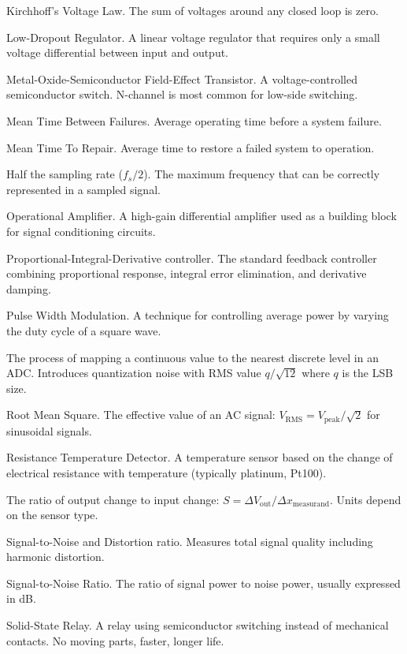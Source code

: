 \documentclass[11pt,letterpaper,twoside,openany]{book}
\begin{document}
\begin{description}[style=nextline,leftmargin=3em,font=\sffamily\bfseries]
\item[KVL] Kirchhoff's Voltage Law. The sum of voltages around any closed loop is zero.
\item[LDO] Low-Dropout Regulator. A linear voltage regulator that requires only a small voltage differential between input and output.
\item[MOSFET] Metal-Oxide-Semiconductor Field-Effect Transistor. A voltage-controlled semiconductor switch. N-channel is most common for low-side switching.
\item[MTBF] Mean Time Between Failures. Average operating time before a system failure.
\item[MTTR] Mean Time To Repair. Average time to restore a failed system to operation.
\item[Nyquist Frequency] Half the sampling rate ($f_s/2$). The maximum frequency that can be correctly represented in a sampled signal.
\item[Op-Amp] Operational Amplifier. A high-gain differential amplifier used as a building block for signal conditioning circuits.
\item[PID] Proportional-Integral-Derivative controller. The standard feedback controller combining proportional response, integral error elimination, and derivative damping.
\item[PWM] Pulse Width Modulation. A technique for controlling average power by varying the duty cycle of a square wave.
\item[Quantization] The process of mapping a continuous value to the nearest discrete level in an ADC. Introduces quantization noise with RMS value $q/\sqrt{12}$ where $q$ is the LSB size.
\item[RMS] Root Mean Square. The effective value of an AC signal: $V_{\text{RMS}} = V_{\text{peak}}/\sqrt{2}$ for sinusoidal signals.
\item[RTD] Resistance Temperature Detector. A temperature sensor based on the change of electrical resistance with temperature (typically platinum, Pt100).
\item[Sensitivity] The ratio of output change to input change: $S = \Delta V_{\text{out}} / \Delta x_{\text{measurand}}$. Units depend on the sensor type.
\item[SINAD] Signal-to-Noise and Distortion ratio. Measures total signal quality including harmonic distortion.
\item[SNR] Signal-to-Noise Ratio. The ratio of signal power to noise power, usually expressed in dB.
\item[SSR] Solid-State Relay. A relay using semiconductor switching instead of mechanical contacts. No moving parts, faster, longer life.

\end{description}
\end{document}
